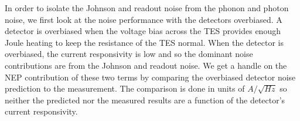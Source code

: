 \documentclass[../EBEXPaper2.tex]{subfiles}
\begin{document}

In order to isolate the Johnson and readout noise from the phonon and photon noise, we first look at the noise performance with the detectors overbiased. 
A detector is overbiased when the voltage bias across the \ac{TES} provides enough Joule heating to keep the resistance of the \ac{TES} normal. 
When the detector is overbiased, the current responsivity is low 
and so the dominant noise contributions are from the Johnson and readout noise. 
We get a handle on the \ac{NEP} contribution of these two terms by comparing the overbiased detector noise prediction to the measurement. 
The comparison is done in units of $A/\sqrt{Hz}$ so neither the predicted nor the measured results are a function of the detector's current responsivity. 
\end{document}
